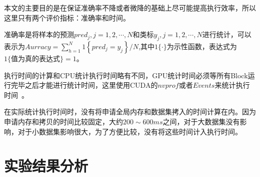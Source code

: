 本文的主要目的是在保证准确率不降或者微降的基础上尽可能提高执行效率，所以这里只有两个评价指标：准确率和时间。

准确率是将样本的预测$pred_j,j=1,2,\cdots,N$和类标$y_j,j=1,2,\cdots,N$进行统计，可以表示为$Aurracy=\sum_{h=1}^{N}\textstyle 1\left\lbrace pred_j=y_j\right\rbrace/N$,其中$\textstyle 1\{\cdot\}$为示性函数，表达式为$\textstyle 1\{ \text{值为真的表达式} \textstyle \}=1$。

执行时间的计算和CPU统计执行时间略有不同，GPU统计时间必须等所有Block运行完毕之后才能进行统计时间，这里使用CUDA的$nvprof$或者$Events$来统计执行时间~\cite{nvidia2015c}。

在实际统计执行时间时，没有将申请全局内存和数据集拷入的时间计算在内。因为申请内存和拷贝的时间比较固定，大约$200\sim 600ms$之间，对于大数据集没有影响，对于小数据集影响很大，为了方便比较，没有将这些时间计入执行时间。

\section{实验结果分析}




